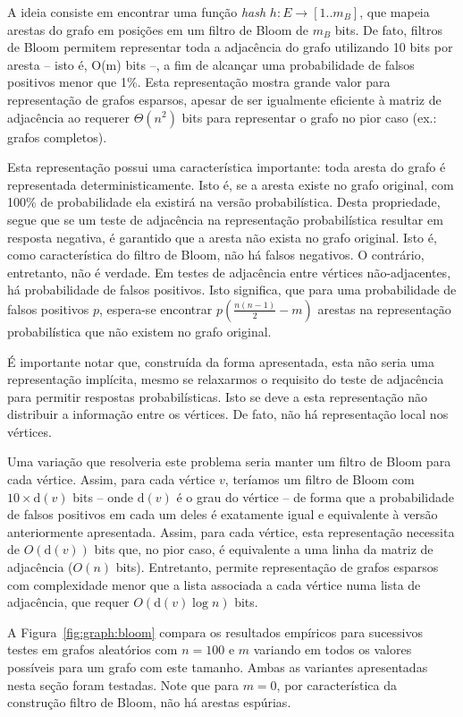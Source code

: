 A ideia consiste em encontrar uma função \emph{hash} $h: E \to [1..m_B]$, que mapeia arestas do grafo em posições em um filtro de Bloom de $m_B$ bits. De fato, filtros de Bloom permitem representar toda a adjacência do grafo utilizando 10 bits por aresta -- isto é, O(m) bits --, a fim de alcançar uma probabilidade de falsos positivos menor que 1\%. Esta representação mostra grande valor para representação de grafos esparsos, apesar de ser igualmente eficiente à matriz de adjacência ao requerer $\Theta(n^2)$ bits para representar o grafo no pior caso (ex.: grafos completos).

Esta representação possui uma característica importante: toda aresta do grafo é representada deterministicamente. Isto é, se a aresta existe no grafo original, com 100\% de probabilidade ela existirá na versão probabilística. Desta propriedade, segue que se um teste de adjacência na representação probabilística resultar em resposta negativa, é garantido que a aresta não exista no grafo original. Isto é, como característica do filtro de Bloom, não há falsos negativos. O contrário, entretanto, não é verdade. Em testes de adjacência entre vértices não-adjacentes, há probabilidade de falsos positivos. Isto significa, que para uma probabilidade de falsos positivos $p$, espera-se encontrar $p(\frac{n(n-1)}{2}-m)$ arestas na representação probabilística que não existem no grafo original.

É importante notar que, construída da forma apresentada, esta não seria uma representação implícita, mesmo se relaxarmos o requisito do teste de adjacência para permitir respostas probabilísticas. Isto se deve a esta representação não distribuir a informação entre os vértices. De fato, não há representação local nos vértices.

Uma variação que resolveria este problema seria manter um filtro de Bloom para cada vértice. Assim, para cada vértice $v$, teríamos um filtro de Bloom com $10 \times \text{d}(v)$ bits -- onde $\text{d}(v)$ é o grau do vértice -- de forma que a probabilidade de falsos positivos em cada um deles é exatamente igual e equivalente à versão anteriormente apresentada. Assim, para cada vértice, esta representação necessita de $O(\text{d}(v))$ bits que, no pior caso, é equivalente a uma linha da matriz de adjacência ($O(n)$ bits). Entretanto, permite representação de grafos esparsos com complexidade menor que a lista associada a cada vértice numa lista de adjacência, que requer $O(\text{d}(v) \log n)$ bits.

A Figura~\ref{fig:graph:bloom} compara os resultados empíricos para sucessivos testes em grafos aleatórios com $n = 100$ e $m$ variando em todos os valores possíveis para um grafo com este tamanho. Ambas as variantes apresentadas nesta seção foram testadas. Note que para $m=0$, por característica da construção filtro de Bloom, não há arestas espúrias.

